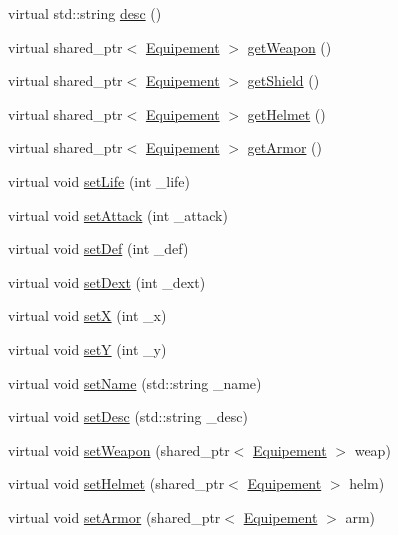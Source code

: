 \begin{DoxyCompactItemize}
virtual std\-::string \hyperlink{classCharacter_aeb05a9fcf7e9da62329b8b5de6a7acc9}{desc} ()
\item 
virtual shared\-\_\-ptr$<$ \hyperlink{classEquipement}{Equipement} $>$ \hyperlink{classCharacter_a67b84cfa139de98e9bed0a7d3dd5ab8e}{get\-Weapon} ()
\item 
virtual shared\-\_\-ptr$<$ \hyperlink{classEquipement}{Equipement} $>$ \hyperlink{classCharacter_a87ffb6438e83aae28b77e3fc89c4324a}{get\-Shield} ()
\item 
virtual shared\-\_\-ptr$<$ \hyperlink{classEquipement}{Equipement} $>$ \hyperlink{classCharacter_ac3534a0ae2e17d28220909a673f4cd95}{get\-Helmet} ()
\item 
virtual shared\-\_\-ptr$<$ \hyperlink{classEquipement}{Equipement} $>$ \hyperlink{classCharacter_ab821499d2b8cdcb135d878c9995ace4c}{get\-Armor} ()
\item 
virtual void \hyperlink{classCharacter_a91259e5c6dac1f8bfbee2db6155b2a75}{set\-Life} (int \-\_\-life)
\item 
virtual void \hyperlink{classCharacter_afba6584b7c21ce4e75c88c1e7bd6dea8}{set\-Attack} (int \-\_\-attack)
\item 
virtual void \hyperlink{classCharacter_a6274ca6b657f591212920d89166ac730}{set\-Def} (int \-\_\-def)
\item 
virtual void \hyperlink{classCharacter_ab31cb447b16cb88c3f078d0b2c0feb8e}{set\-Dext} (int \-\_\-dext)
\item 
virtual void \hyperlink{classCharacter_ab666a436a79cfa39a9d30e0025e1287a}{set\-X} (int \-\_\-x)
\item 
virtual void \hyperlink{classCharacter_a332de99662682fa6512c88ebbb2b28e9}{set\-Y} (int \-\_\-y)
\item 
virtual void \hyperlink{classCharacter_a60e49a746ceec14e7dfba95f050d52f3}{set\-Name} (std\-::string \-\_\-name)
\item 
virtual void \hyperlink{classCharacter_a73a895a3fe5c6f68dc0a9e1d04e9bae5}{set\-Desc} (std\-::string \-\_\-desc)
\item 
virtual void \hyperlink{classCharacter_a293376b90a5af15b873c240cf662a136}{set\-Weapon} (shared\-\_\-ptr$<$ \hyperlink{classEquipement}{Equipement} $>$ weap)
\item 
virtual void \hyperlink{classCharacter_a4919e0c0f1177631fc6baa3a166ee266}{set\-Helmet} (shared\-\_\-ptr$<$ \hyperlink{classEquipement}{Equipement} $>$ helm)
\item 
virtual void \hyperlink{classCharacter_ab4535f7a11cdc2ea5b263873c00db7cc}{set\-Armor} (shared\-\_\-ptr$<$ \hyperlink{classEquipement}{Equipement} $>$ arm)

\end{DoxyCompactItemize}
